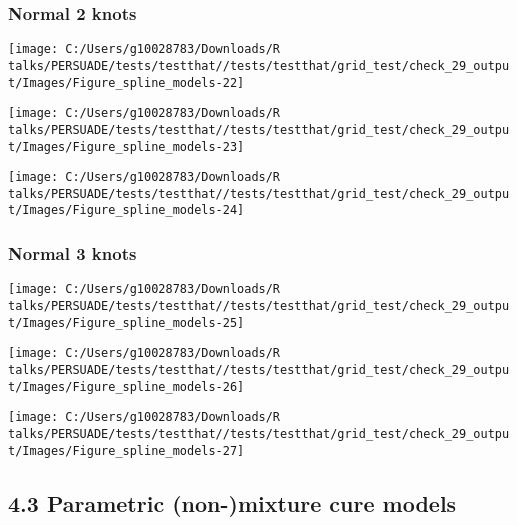\documentclass[
]{article}
\begin{document}
\subsubsection{Normal 2 knots}\label{normal-2-knots}

\begin{flushleft}\texttt{[image: C:/Users/g10028783/Downloads/R talks/PERSUADE/tests/testthat//tests/testthat/grid\_test/check\_29\_output/Images/Figure\_spline\_models-22]} \end{flushleft}

\begin{flushleft}\texttt{[image: C:/Users/g10028783/Downloads/R talks/PERSUADE/tests/testthat//tests/testthat/grid\_test/check\_29\_output/Images/Figure\_spline\_models-23]} \end{flushleft}

\begin{flushleft}\texttt{[image: C:/Users/g10028783/Downloads/R talks/PERSUADE/tests/testthat//tests/testthat/grid\_test/check\_29\_output/Images/Figure\_spline\_models-24]} \end{flushleft}

\clearpage

\subsubsection{Normal 3 knots}\label{normal-3-knots}

\begin{flushleft}\texttt{[image: C:/Users/g10028783/Downloads/R talks/PERSUADE/tests/testthat//tests/testthat/grid\_test/check\_29\_output/Images/Figure\_spline\_models-25]} \end{flushleft}

\begin{flushleft}\texttt{[image: C:/Users/g10028783/Downloads/R talks/PERSUADE/tests/testthat//tests/testthat/grid\_test/check\_29\_output/Images/Figure\_spline\_models-26]} \end{flushleft}

\begin{flushleft}\texttt{[image: C:/Users/g10028783/Downloads/R talks/PERSUADE/tests/testthat//tests/testthat/grid\_test/check\_29\_output/Images/Figure\_spline\_models-27]} \end{flushleft}

\clearpage

\subsection{4.3 Parametric (non-)mixture cure
models}\label{parametric-non-mixture-cure-models}
\end{document}
